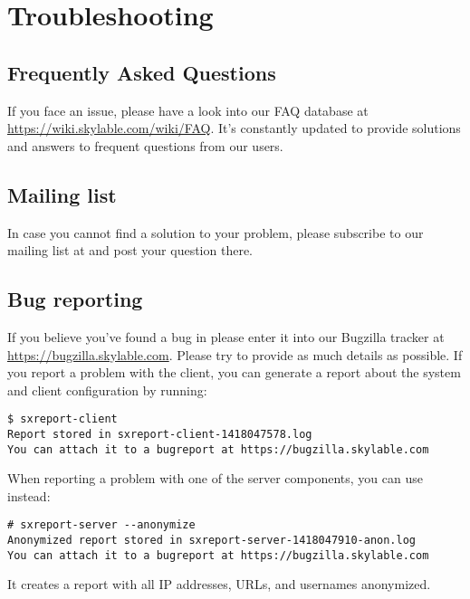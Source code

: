 \chapter{Troubleshooting}

\section{Frequently Asked Questions}
If you face an issue, please have a look into our FAQ database
at \url{https://wiki.skylable.com/wiki/FAQ}. It's constantly
updated to provide solutions and answers to frequent questions
from our users.

\section{Mailing list}
In case you cannot find a solution to your problem, please
subscribe to our mailing list  at
 and post your question there.

\section{Bug reporting}
If you believe you've found a bug in \SX please enter it into
our Bugzilla tracker at \url{https://bugzilla.skylable.com}.
Please try to provide as much details as possible. If you
report a problem with the client, you can generate a report about
the system and client configuration by running:
\begin{lstlisting}
$ sxreport-client
Report stored in sxreport-client-1418047578.log
You can attach it to a bugreport at https://bugzilla.skylable.com
\end{lstlisting}
When reporting a problem with one of the server components, you can
use  instead:
\begin{lstlisting}
# sxreport-server --anonymize
Anonymized report stored in sxreport-server-1418047910-anon.log
You can attach it to a bugreport at https://bugzilla.skylable.com
\end{lstlisting}
It creates a report with all IP addresses, URLs, and usernames
anonymized.
